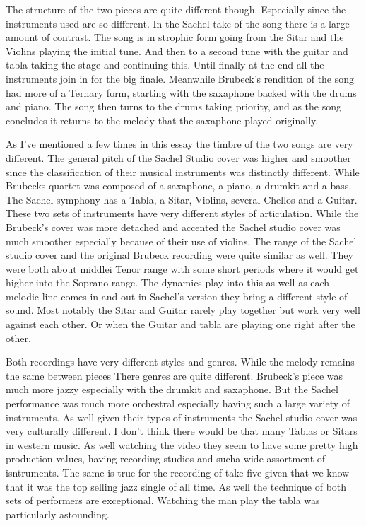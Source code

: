 \documentclass{article}
\begin{document}
The structure of the two pieces are quite different though. Especially since the
instruments used are so different. In the Sachel take of the song there is a
large amount of contrast. The song is in strophic form going from the Sitar and
the Violins playing the initial tune. And then to a second tune with the guitar
and tabla taking the stage and continuing this. Until finally at the end all the
instruments join in for the big finale. Meanwhile Brubeck's rendition of the
song had more of a Ternary form, starting with the saxaphone backed with the
drums and piano. The song then turns to the drums taking priority, and as the
song concludes it returns to the melody that the saxaphone played originally. 

As I've mentioned a few times in this essay the timbre of the two songs are very
different. The general pitch of the Sachel Studio cover was higher and smoother
since the classification of their musical instruments was distinctly different.
While Brubecks quartet was composed of a saxaphone, a piano, a drumkit and a
bass. The Sachel symphony has a Tabla, a Sitar, Violins, several Chellos and a
Guitar. These two sets of instruments have very different styles of
articulation. While the Brubeck's cover was more detached and accented the
Sachel studio cover was much smoother especially because of their use of
violins. The range of the Sachel studio cover and the original Brubeck recording
were quite similar as well. They were both about middlei Tenor range with some 
short periods where it would get higher into the Soprano range. The dynamics 
play into this as well as each melodic line comes in and out in Sachel's version
they bring a different style of sound. Most notably the Sitar and Guitar rarely
play together but work very well against each other. Or when the Guitar and
tabla are playing one right after the other.

Both recordings have very different styles and genres. While the melody remains
the same between pieces There genres are quite different. Brubeck's piece was
much more jazzy especially with the drumkit and saxaphone. But the Sachel
performance was much more orchestral especially having such a large variety of
instruments. As well given their types of instruments the Sachel studio cover
was very culturally different. I don't think there would be that many Tablas or
Sitars in western music. As well watching the video they seem to have some
pretty high production values, having recording studios and sucha wide
assortment of isntruments. The same is true for the recording of take five given
that we know that it was the top selling jazz single of all time. As well the
technique of both sets of performers are exceptional. Watching the man play the
tabla was particularly astounding.
\end{document}
